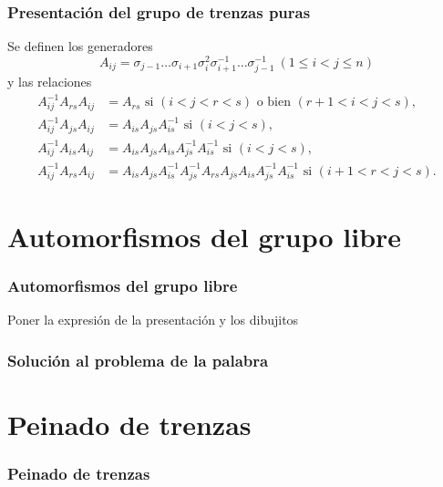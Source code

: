 \documentclass{beamer}
\theoremstyle{definition}
\begin{document}
\begin{frame}
\frametitle{Presentación del grupo de trenzas puras}
Se definen los generadores 
\[
A_{ij}=\sigma_{j-1}\dots\sigma_{i+1}\sigma_i^2\sigma_{i+1}^{-1}\dots\sigma_{j-1}^{-1}\ (1\leq i<j\leq n)
\]
y las relaciones
\begin{align*}
A_{ij}^{-1}A_{rs}A_{ij}&=A_{rs}\text{ si } (i<j<r<s)\text{ o bien } (r+1<i<j<s),\\
A_{ij}^{-1}A_{js}A_{ij}&=A_{is}A_{js}A_{is}^{-1} \text{ si } (i<j<s),\\
A_{ij}^{-1}A_{is}A_{ij}&=A_{is}A_{js}A_{is}A_{js}^{-1}A_{is}^{-1}\text{ si } (i<j<s),\\
A_{ij}^{-1}A_{rs}A_{ij}&=A_{is}A_{js}A_{is}^{-1}A_{js}^{-1}A_{rs}A_{js}A_{is}A_{js}^{-1}A_{is}^{-1}\text{ si } (i+1<r<j<s).
\end{align*}
\end{frame}

\section{Automorfismos del grupo libre}
\begin{frame}
\frametitle{Automorfismos del grupo libre}
\end{frame}

\begin{frame}
Poner la expresión de la presentación y los dibujitos
\end{frame}

\begin{frame}
\frametitle{Solución al problema de la palabra}
\end{frame}

\section{Peinado de trenzas}
\begin{frame}
\frametitle{Peinado de trenzas}
\end{frame}
\end{document}

